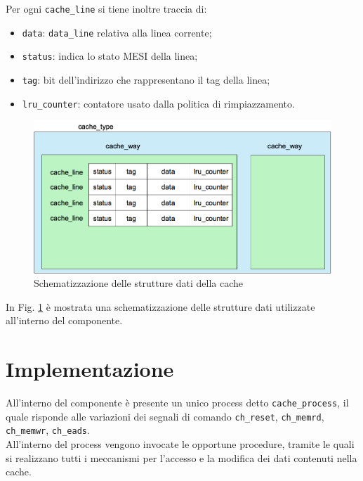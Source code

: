 Per ogni \texttt{cache\_line} si tiene inoltre traccia di:
\begin{itemize}
  \item \texttt{data}: \texttt{data\_line} relativa alla linea corrente;
  \item \texttt{status}: indica lo stato MESI della linea;
  \item \texttt{tag}: bit dell'indirizzo che rappresentano il tag della linea;
  \item \texttt{lru\_counter}: contatore usato dalla politica di rimpiazzamento.
\end{itemize}


\begin{figure}[h!]
\centering
\includegraphics[width=\textwidth]{img/cacheType.png}
\caption{Schematizzazione delle strutture dati della cache}
\label{fig:c_type}
\end{figure}

In Fig. \ref{fig:c_type} \`e mostrata una schematizzazione delle strutture dati utilizzate all'interno del componente.

\section{Implementazione}

All'interno del componente \`e presente un unico process detto \texttt{cache\_process}, il quale risponde alle variazioni dei segnali di comando \texttt{ch\_reset}, \texttt{ch\_memrd}, \texttt{ch\_memwr}, \texttt{ch\_eads}.\\

All'interno del process vengono invocate le opportune procedure, tramite le quali si realizzano tutti i meccanismi per l'accesso e la modifica dei dati contenuti nella cache.\\



